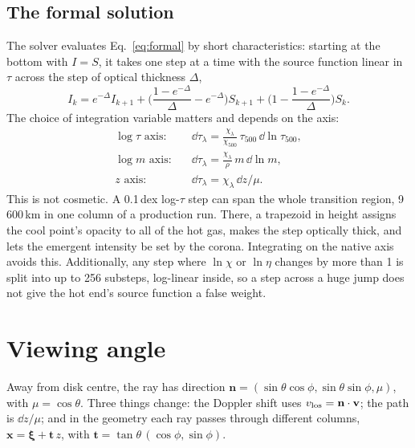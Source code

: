 \subsection{The formal solution}
The solver evaluates Eq.~\eqref{eq:formal} by short characteristics: starting at the bottom with $I=S$, it takes one step at a time with the source function linear in $\tau$ across the step of optical thickness $\Delta$,
\begin{equation}
I_k=e^{-\Delta}I_{k+1}+\Big(\frac{1-e^{-\Delta}}{\Delta}-e^{-\Delta}\Big)S_{k+1}+\Big(1-\frac{1-e^{-\Delta}}{\Delta}\Big)S_k .
\end{equation}
The choice of integration variable matters and depends on the axis:
\begin{align}
\log\tau\text{ axis:}&\quad \dd\tau_\lambda=\frac{\chi_\lambda}{\chi_{500}}\,\tau_{500}\,\dd\ln\tau_{500},\\
\log m\text{ axis:}&\quad \dd\tau_\lambda=\frac{\chi_\lambda}{\rho}\,m\,\dd\ln m,\\
z\text{ axis:}&\quad \dd\tau_\lambda=\chi_\lambda\,\dd z/\mu .
\end{align}
This is not cosmetic. A 0.1\,dex log-$\tau$ step can span the whole transition region, 9\,600\,km in one column of a production run. There, a trapezoid in height assigns the cool point's opacity to all of the hot gas, makes the step optically thick, and lets the emergent intensity be set by the corona. Integrating on the native axis avoids this. Additionally, any step where $\ln\chi$ or $\ln\eta$ changes by more than 1 is split into up to 256 substeps, log-linear inside, so a step across a huge jump does not give the hot end's source function a false weight.

\section{Viewing angle}
Away from disk centre, the ray has direction $\mathbf n=(\sin\theta\cos\phi,\sin\theta\sin\phi,\mu)$, with $\mu=\cos\theta$. Three things change: the Doppler shift uses $v_{\rm los}=\mathbf n\cdot\mathbf v$; the path is $\dd z/\mu$; and in the  geometry each ray passes through different columns, $\mathbf x=\boldsymbol\xi+\mathbf t\,z$, with $\mathbf t=\tan\theta\,(\cos\phi,\sin\phi)$.

